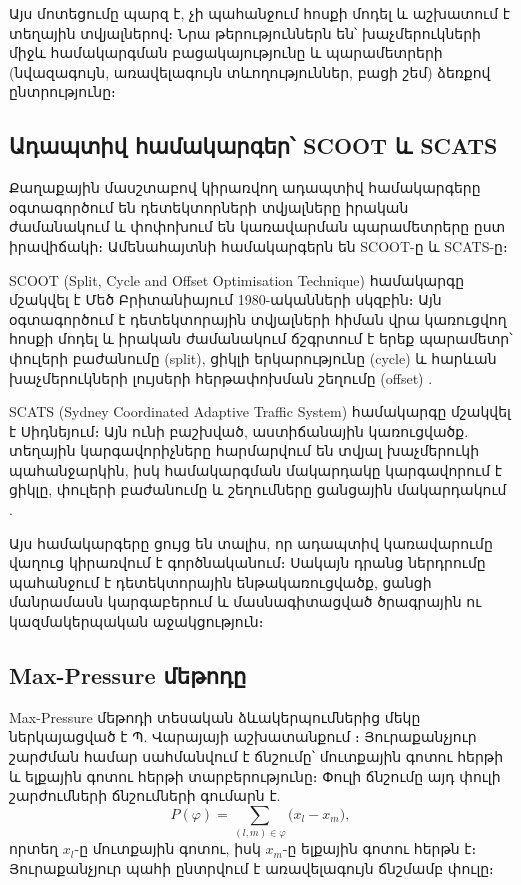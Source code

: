 \documentclass[12pt,a4paper]{extreport}
\begin{document}
Այս մոտեցումը պարզ է, չի պահանջում հոսքի մոդել և աշխատում է տեղային տվյալներով։ Նրա թերություններն են՝ խաչմերուկների միջև համակարգման բացակայությունը և պարամետրերի (նվազագույն, առավելագույն տևողություններ, բացի շեմ) ձեռքով ընտրությունը։

\subsection{Ադապտիվ համակարգեր՝ SCOOT և SCATS}

Քաղաքային մասշտաբով կիրառվող ադապտիվ համակարգերը օգտագործում են դետեկտորների տվյալները իրական ժամանակում և փոփոխում են կառավարման պարամետրերը ըստ իրավիճակի։ Ամենահայտնի համակարգերն են SCOOT-ը և SCATS-ը։

SCOOT (Split, Cycle and Offset Optimisation Technique) համակարգը մշակվել է Մեծ Բրիտանիայում 1980-ականների սկզբին։ Այն օգտագործում է դետեկտորային տվյալների հիման վրա կառուցվող հոսքի մոդել և իրական ժամանակում ճշգրտում է երեք պարամետր՝ փուլերի բաժանումը (split), ցիկլի երկարությունը (cycle) և հարևան խաչմերուկների լույսերի հերթափոխման շեղումը (offset) \cite{hunt1981}.

SCATS (Sydney Coordinated Adaptive Traffic System) համակարգը մշակվել է Սիդնեյում։ Այն ունի բաշխված, աստիճանային կառուցվածք. տեղային կարգավորիչները հարմարվում են տվյալ խաչմերուկի պահանջարկին, իսկ համակարգման մակարդակը կարգավորում է ցիկլը, փուլերի բաժանումը և շեղումները ցանցային մակարդակում \cite{lowrie1982}.

Այս համակարգերը ցույց են տալիս, որ ադապտիվ կառավարումը վաղուց կիրառվում է գործնականում։ Սակայն դրանց ներդրումը պահանջում է դետեկտորային ենթակառուցվածք, ցանցի մանրամասն կարգաբերում և մասնագիտացված ծրագրային ու կազմակերպական աջակցություն։

\subsection{Max-Pressure մեթոդը}

Max-Pressure մեթոդի տեսական ձևակերպումներից մեկը ներկայացված է Պ. Վարայայի աշխատանքում \cite{varaiya2013}։ Յուրաքանչյուր շարժման համար սահմանվում է ճնշումը՝ մուտքային գոտու հերթի և ելքային գոտու հերթի տարբերությունը։ Փուլի ճնշումը այդ փուլի շարժումների ճնշումների գումարն է.
\begin{equation}
  P(\varphi) = \sum_{(l,m)\in\varphi} \bigl(x_l - x_m\bigr),
\end{equation}
որտեղ $x_l$-ը մուտքային գոտու, իսկ $x_m$-ը ելքային գոտու հերթն է։ Յուրաքանչյուր պահի ընտրվում է առավելագույն ճնշմամբ փուլը։
\end{document}
